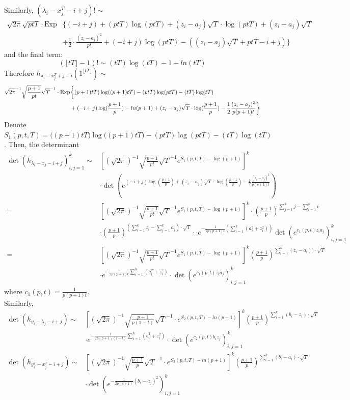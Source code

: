 \documentclass[12pt]{article}
\begin{document}
Similarly, $(\lambda_{i}-x_{j}^{T}-i+j)!\sim$
\begin{align*}
\sqrt{2\pi}\sqrt{ptT}\cdot \text{Exp}&\{(-i+j) + (ptT)\log(ptT)+(z_{i}-a_{j})\sqrt{T}\cdot \log(ptT)+(z_{i}-a_{j})\sqrt{T}\\
& +\frac{1}{2}\cdot\frac{(z_{i}-a_{j})^2}{pt}+(-i+j)\log(ptT)-((z_{i}-a_{j})\sqrt{T} + ptT-i+j)\}
\end{align*} and the final term: $$
(\lfloor tT \rfloor-1)!\sim (tT)\log(tT)-1-ln(tT)$$
Therefore $h_{\lambda_{i}-x^{T}_{j}+j-i}(1^{\lfloor tT \rfloor})\sim$
\begin{align*}
	\sqrt{2\pi}^{-1}\sqrt{\frac{p+1}{pt}}\sqrt{T}^{-1}\cdot \text{Exp}&\bigg\{\vphantom((p+1)tT)\log((p+1)tT)-(ptT)\log(ptT)-(tT)\log(tT)\\
	& +(-i+j)\log(\frac{p+1}{p})-ln(p+1)+(z_{i}-a_{j})\sqrt{T}\cdot \log(\frac{p+1}{p})-\frac{1}{2}\frac{(z_{i}-a_{j})^{2}}{p(p+1)t}\bigg\}
\end{align*}
Denote $S_{1}(p,t,T)=\big((p+1)tT)\log((p+1)tT\big)-(ptT)\log(ptT)-(tT)\log(tT)$. Then, the determinant 
\begin{align*} 
\det(h_{\lambda_{i}-x_{j}-i+j})_{i,j=1}^{k} \sim&\left[(\sqrt{2\pi})^{-1}\sqrt{\frac{p+1}{pt}}\sqrt{T}^{-1}e^{S_{1}(p,t,T)-\log(p+1)}\right]^{k}\\
&\cdot
	 \det\left(e^{(-i+j)\log(\frac{p+1}{p})+(z_{i}-a_{j})\sqrt{T}\cdot \log(\frac{p+1}{p})-\frac{1}{2}\frac{(z_{i}-a_{j})^2}{p(p+1)t}}\right)\\
	=&\left[(\sqrt{2\pi})^{-1}\sqrt{\frac{p+1}{pt}}\sqrt{T}^{-1}e^{S_{1}(p,t,T)-\log(p+1)}\right]^{k}\cdot \left(\frac{p+1}{p}\right)^{\sum_{j=1}^k j-\sum_{i=1}^{k}i} \\
	 &\cdot\left(\frac{p+1}{p}\right)^{\left(\sum_{i=1}^{k}z_{i}-\sum_{j=1}^{k}a_{j}\right)\cdot\sqrt{T}}\cdot \cdot e^{-\frac{1}{2p(p+1)t}(\sum_{i=1}^{k}(a_{i}^2+z_{i}^2))}\det(e^{c_{1}(p,t)z_{i}a_{j}})_{i,j=1}^{k}\\
	 =& \left[(\sqrt{2\pi})^{-1}\sqrt{\frac{p+1}{pt}}\sqrt{T}^{-1}e^{S_{1}(p,t,T)-\log(p+1)}\right]^{k}\left(\frac{p+1}{p}\right)^{\sum_{i=1}^{k}(z_{i}-a_{i}))\cdot\sqrt{T}} \\
	&\cdot e^{-\frac{1}{2p(p+1)t}\sum_{i=1}^{k}(a_{i}^2+z_{i}^2)}\cdot \det\left(e^{c_{1}(p,t)z_{i}a_{j}}\right)_{i,j=1}^{k}
\end{align*}
where $c_{1}(p,t)=\frac{1}{p(p+1)t}$.\\
Similarly,
\begin{align*}
	\det \left(h_{y_{i}-\lambda_{j}-i+j}\right)\sim& \left[(\sqrt{2\pi})^{-1}\sqrt{\frac{p+1}{p(1-t)}}\sqrt{T}^{-1}\cdot e^{S_{2}(p,t,T)-ln(p+1)}\right]^{k}\left(\frac{p+1}{p}\right)^{\sum_{i=1}^{k}(b_{i}-z_{i})\cdot\sqrt{T}} \\
	& \cdot e^{-\frac{1}{2p(p+1)(1-t)}\sum_{i=1}^{k}(b_{i}^2+z_{i}^2)}\cdot \det\left(e^{c_{2}(p,t)b_{i}z_{j}}\right)_{i,j=1}^{k}\\
	\det(h_{y_{i}^{T}-x_{j}^{T}-i+j})\sim& \left[(\sqrt{2\pi})^{-1}\sqrt{\frac{p+1}{p}}\sqrt{T}^{-1}\cdot e^{S_{3}(p,t,T)-ln(p+1)}\right]^{k}\left(\frac{p+1}{p}\right)^{\sum_{i=1}^{k}(b_{i}-a_{i})\cdot\sqrt{T}} \\
	&\cdot \det\left(e^{-\frac{1}{2p(p+1)}(b_{i}-a_{j})^2}\right)_{i,j=1}^{k}
	\end{align*}
\end{document}
